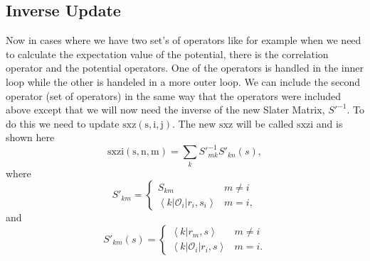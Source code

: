 \documentclass[12pt]{extarticle}
\newcommand{\Oi}{\mathcal{O}_{i}}
\newcommand{\ket}[1]{\left| #1 \right>}
\newcommand{\bra}[1]{\left< #1 \right|}
\newcommand{\braket}[2]{\left< #1 | #2 \right>}
\begin{document}
\subsection{Inverse Update}
Now in cases where we have two set's of operators like for example when we need to calculate the expectation value of the potential, there is the correlation operator and the potential operators. One of the operators is handled in the inner loop while the other is handeled in a more outer loop. We can include the second operator (set of operators) in the same way that the operators were included above except that we will now need the inverse of the new Slater Matrix, $S'^{-1}$. To do this we need to update $\mathrm{sxz(s,i,j)}$. The new $\mathrm{sxz}$ will be called $\mathrm{sxzi}$ and is shown here
\begin{equation}
  \mathrm{sxzi(s,n,m)} = \sum_k S'^{-1}_{mk}S'_{kn}(s),
\end{equation}
where
\begin{equation}
  S'_{km} = \begin{cases}
    S_{km} & m \neq i \\
    \bra{k} \Oi \ket{r_i,s_i} & m=i,
  \end{cases}
\end{equation}
and
\begin{equation}
  S'_{km}(s) = \begin{cases}
    \braket{k}{r_m,s} & m \neq i \\
    \bra{k} \Oi \ket{r_i,s} & m=i.
  \end{cases}
\end{equation}
\end{document}
